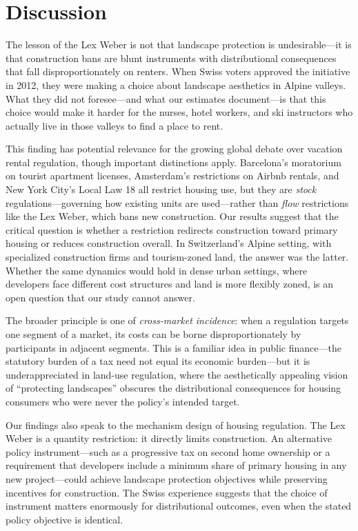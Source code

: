 \documentclass[12pt]{article}
\begin{document}
\section{Discussion}
\label{sec:discussion}

The lesson of the Lex Weber is not that landscape protection is undesirable---it is that construction bans are blunt instruments with distributional consequences that fall disproportionately on renters. When Swiss voters approved the initiative in 2012, they were making a choice about landscape aesthetics in Alpine valleys. What they did not foresee---and what our estimates document---is that this choice would make it harder for the nurses, hotel workers, and ski instructors who actually live in those valleys to find a place to rent.

This finding has potential relevance for the growing global debate over vacation rental regulation, though important distinctions apply. Barcelona's moratorium on tourist apartment licenses, Amsterdam's restrictions on Airbnb rentals, and New York City's Local Law 18 all restrict housing use, but they are \textit{stock} regulations---governing how existing units are used---rather than \textit{flow} restrictions like the Lex Weber, which bans new construction. Our results suggest that the critical question is whether a restriction redirects construction toward primary housing or reduces construction overall. In Switzerland's Alpine setting, with specialized construction firms and tourism-zoned land, the answer was the latter. Whether the same dynamics would hold in dense urban settings, where developers face different cost structures and land is more flexibly zoned, is an open question that our study cannot answer.

The broader principle is one of \textit{cross-market incidence}: when a regulation targets one segment of a market, its costs can be borne disproportionately by participants in adjacent segments. This is a familiar idea in public finance---the statutory burden of a tax need not equal its economic burden---but it is underappreciated in land-use regulation, where the aesthetically appealing vision of ``protecting landscapes'' obscures the distributional consequences for housing consumers who were never the policy's intended target.

Our findings also speak to the mechanism design of housing regulation. The Lex Weber is a quantity restriction: it directly limits construction. An alternative policy instrument---such as a progressive tax on second home ownership or a requirement that developers include a minimum share of primary housing in any new project---could achieve landscape protection objectives while preserving incentives for construction. The Swiss experience suggests that the choice of instrument matters enormously for distributional outcomes, even when the stated policy objective is identical.
\end{document}
